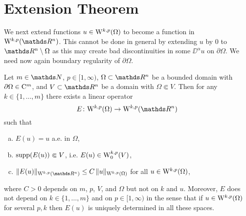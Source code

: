 \section{Extension Theorem}

We next extend functions $u \in \mathrm{W}^{k,p}(\Omega)$ to become a function in $\WW^{k,p}(\R^n)$.
This cannot be done in general by extending $u$ by $0$ to $\R^n \setminus \Omega$ as this may create bad discontinuities in some $\DD^\alpha u$ on $\partial\Omega$.
We need now again boundary regularity of $\partial\Omega$.

\begin{thm}  
  \label{thm:extension}
  Let $m \in \N$, $p \in [1,\infty)$, $\Omega \subset \R^n$ be a bounded domain with $\partial \Omega \in \mathrm{C}^m$, and $V \subset \R^n$ be a domain with $\Omega \Subset V$.
  Then for any $k \in \{1,\dots,m\}$ there exists a linear operator
  $$
  E \colon \WW^{k,p}(\Omega) \to \WW^{k,p}(\R^n)
  $$
  such that
  \begin{enumerate}[a)]
    \item $E(u) = u$ a.e. in $\Omega$,
    \item $\operatorname{supp}(E(u)) \Subset V$, i.e. $E(u) \in \mathrm{W}_0^{k,p}(V)$,
    \item $\|E(u)\|_{\WW^{k,p}(\R^n)} \leq C \, \| u\|_{\WW^{k,p}(\Omega)}$ for all $u \in \mathrm{W}^{k,p}(\Omega)$,
  \end{enumerate}
  where $C > 0$ depends on $m$, $p$, $V$, and $\Omega$ but not on $k$ and $u$.
  Moreover, $E$ does not depend on $k \in\{1,\dots,m\}$ and on $p \in [1,\infty)$ in the sense that if $u \in \mathrm{W}^{k,p}(\Omega)$ for several $p,k$ then $E(u)$ is uniquely determined in all these spaces.
\end{thm}

